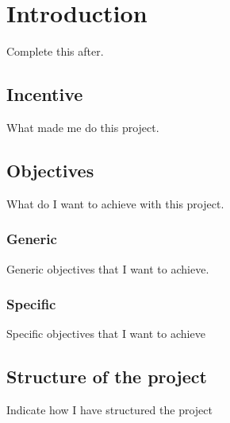 \chapter{Introduction}

Complete this after.

\section{Incentive}
What made me do this project.


\section{Objectives}
What do I want to achieve with this project.

\subsection{Generic}
Generic objectives that I want to achieve.

\subsection{Specific}
Specific objectives that I want to achieve


\section{Structure of the project}
Indicate how I have structured the project